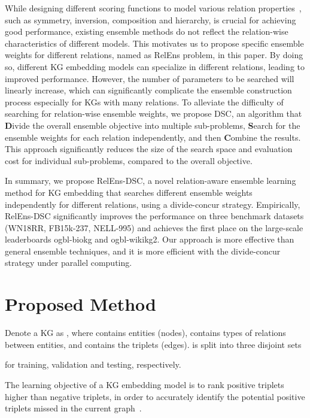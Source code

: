 \documentclass[11pt,a4paper]{article}
\begin{document}
  
  While designing different scoring functions to model various relation properties~\cite{ji2021survey,sun2019rotate,li2022house},
  such as symmetry, inversion, composition and hierarchy,
  is crucial for achieving good performance,
  existing ensemble methods do not reflect the relation-wise
  characteristics of different models.
  This
  motivates
  us to propose specific ensemble weights for different relations,
  named as RelEns problem, 
  in this paper.
  By doing so,
  different KG embedding models can specialize in different relations, 
  leading to improved performance.
  However,
  the number of parameters to be searched will linearly increase,
  which can significantly complicate the ensemble construction process
  especially for KGs with many relations.
  To alleviate the difficulty of searching for relation-wise ensemble weights,
  we propose DSC, an algorithm that
  \textbf{D}ivide the overall ensemble objective  into multiple sub-problems,
  \textbf{S}earch for the ensemble weights for each relation independently,
  and then \textbf{C}ombine the results.
  This approach significantly reduces the size of the search space
  and evaluation cost for individual sub-problems, 
  compared to the overall objective.
  
  In summary,
  we propose  RelEns-DSC, 
  a novel relation-aware ensemble learning method for KG embedding 
  that searches different ensemble weights independently for different relations, 
  using a divide-concur strategy.
  Empirically,
  RelEns-DSC significantly improves the performance on three benchmark datasets
  (WN18RR, FB15k-237, NELL-995)
  and achieves the first place on the
  large-scale leaderboards ogbl-biokg and ogbl-wikikg2.
  Our approach is more effective than general ensemble techniques,
  and it is more efficient with the divide-concur strategy under parallel computing.
  
  
  \section{Proposed Method}
  \label{sec:method}
  Denote a KG as ,
  where  contains  entities (nodes),
   contains  types of relations between entities,
  and  contains the triplets (edges).
   is split into three disjoint sets
  
  for training, validation and testing, respectively.
  
  The learning objective of a KG embedding model
  is to rank positive triplets higher than negative triplets,
  in order to accurately identify the potential positive triplets missed in the current graph~\cite{wang2017knowledge,ji2021survey}.
  
\end{document}
